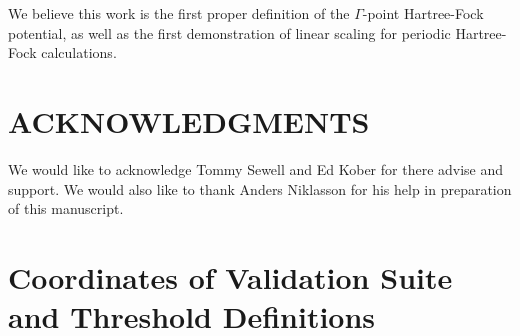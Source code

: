 \documentclass[prb,aps,nobibnotes,twocolumn,doublespace,twocolumngrid,superbib]{revtex4}
\begin{document}
We believe this work is the first proper definition of the $\Gamma$-point
Hartree-Fock potential, as well as the first demonstration of linear scaling
for periodic Hartree-Fock calculations.


\section*{ACKNOWLEDGMENTS}

We would like to acknowledge Tommy Sewell and Ed Kober for there advise
and support. We would also like to thank Anders Niklasson for his help
in preparation of this manuscript. 


 
 


\appendix

\section{Coordinates of Validation Suite and Threshold Definitions}\label{Coordinates}
%
%
%
\begin{table}[ht]
\caption{Fractional coordinates for the triclinic 2 atom unit cell of MgO, cooresponding to the 
         calculations reported in Table~\ref{MgOTable}.  Length of the unit cell is 
         $a=b=c=2.977776807$\AA $\,$ with angles $\alpha=\beta=\gamma=60^\circ$.}
\end{table}
\end{document}
